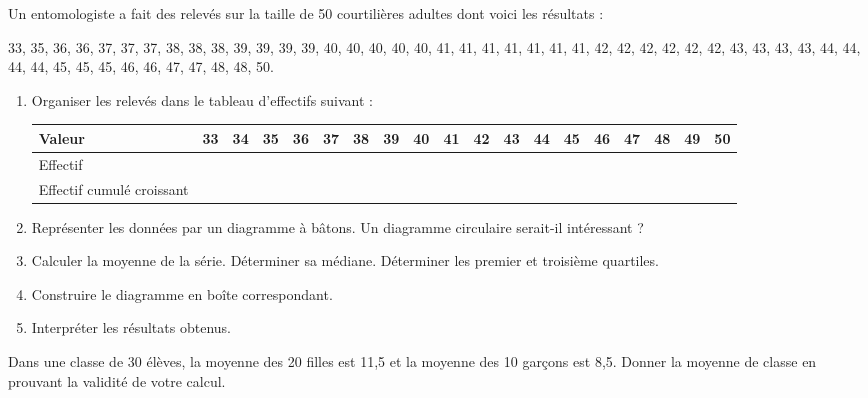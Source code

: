 \begin{exo}
Un entomologiste a fait des relev\'es sur la taille de 50 courtili\`eres adultes dont voici les r\'esultats :
\begin{center}
33, 35, 36, 36, 37, 37, 37, 38, 38, 38, 39, 39, 39, 39, 40, 40, 40, 40, 40, 41, 41, 41, 41, 41, 41, 41, 42, 42, 42, 42, 42, 42, 43, 43, 43, 43, 44, 44, 44, 44, 45, 45, 45, 46, 46, 47, 47, 48, 48, 50.\end{center}
\begin{enumerate}
	\item Organiser les relev\'es dans le tableau d'effectifs suivant :\\
\footnotesize \begin{tabular}{|m{2.5cm}|*{18}{c|}}\hline
Valeur & 33&34&35&36&37&38&39&40&41&42&43&44&45&46&47&48&49&50\\ \hline
Effectif&&&&&&&&&&&&&&&&&&\\ \hline
Effectif cumul\'e croissant&&&&&&&&&&&&&&&&&&\\\hline
\end{tabular} \normalsize
\item Repr\'esenter les donn\'ees par un diagramme \`a bâtons. Un diagramme circulaire serait-il int\'eressant ?
\item Calculer la moyenne de la s\'erie. D\'eterminer sa m\'ediane.
D\'eterminer les premier et troisi\`eme quartiles.
\item Construire le diagramme en bo\^ite correspondant.
\item Interpr\'eter les r\'esultats obtenus.
\end{enumerate}
\end{exo}

\begin{exo}
Dans une classe de 30 \'el\`eves, la moyenne des 20 filles est 11,5 et la moyenne des 10 gar\c{c}ons est 8,5. Donner la moyenne de classe en prouvant la validit\'e de votre calcul.
\end{exo}

\sautpage

